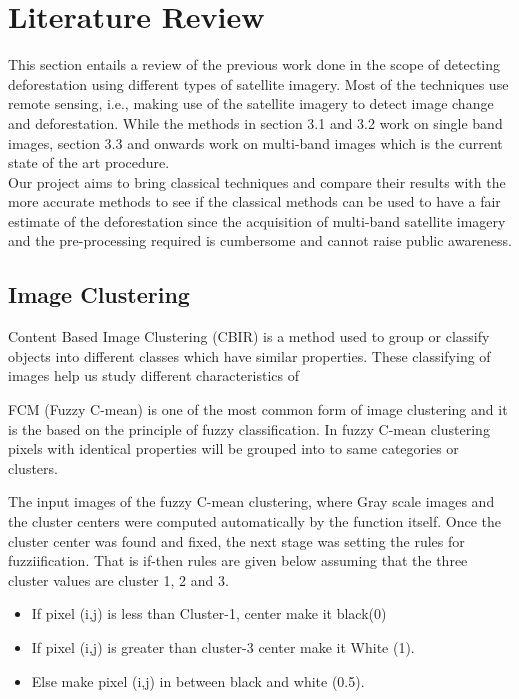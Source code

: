\documentclass[12pt,a4paper,IEEEtran]{article}
\begin{document}
\section{Literature Review}
This section entails a review of the previous work done in the scope of detecting deforestation using different types of satellite imagery. Most of the techniques use remote sensing, i.e., making use of the satellite imagery to detect image change and deforestation. While the methods in section 3.1 and 3.2 work on single band images, section 3.3 and onwards work on multi-band images which is the current state of the art procedure. \\
Our project aims to bring classical techniques and compare their results with the more accurate methods to see if the classical methods can be used to have a fair estimate of the deforestation since the acquisition of multi-band satellite imagery and the pre-processing required is cumbersome and cannot raise public awareness.



\subsection[3.1]{Image Clustering} 
Content Based Image Clustering (CBIR) is a method used to group or classify objects into different classes which have similar properties. These classifying of images help us study different characteristics of 

FCM (Fuzzy C-mean) \cite{BEZDEK1984191} is one of the most common form of image clustering and it is the based on the principle of fuzzy classification. In fuzzy C-mean clustering pixels with identical properties will be grouped into to same categories or clusters.

The input images of the fuzzy C-mean clustering, where Gray scale images and the cluster centers were computed automatically by the function itself. Once the cluster center was found and fixed, the next stage was setting the rules for fuzziification. That is if-then rules are given below assuming that the three cluster values are cluster 1, 2 and 3.
\begin{itemize}
	
	\item If pixel (i,j) is less than Cluster-1, center make it black(0)
	\item If pixel (i,j) is greater than cluster-3 center make it White (1).
	\item Else make pixel (i,j) in between black and white (0.5). 	
\end{itemize}
\end{document}
